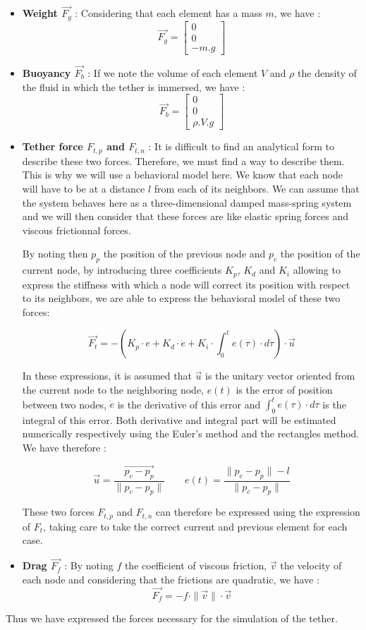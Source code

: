 \begin{itemize}
    \item \textbf{Weight $\overrightarrow{F_g}$} : Considering that each element has a mass $m$, we have : $$\overrightarrow{F_g} = \begin{bmatrix}0\\ 0\\ -m.g\end{bmatrix}$$
    \item \textbf{Buoyancy $\overrightarrow{F_b}$} : If we note the volume of each element $V$ and $\rho$ the density of the fluid in which the tether is immersed, we have : $$\overrightarrow{F_b} = \begin{bmatrix}0\\ 0\\ \rho.V.g\end{bmatrix}$$
    \item \textbf{Tether force $F_{t, p}$ and $F_{t, n}$} : It is difficult to find an analytical form to describe these two forces. Therefore, we must find a way to describe them. This is why we will use a behavioral model here. We know that each node will have to be at a distance $l$ from each of its neighbors. We can assume that the system behaves here as a three-dimensional damped mass-spring system and we will then consider that these forces are like elastic spring forces and viscous frictionnal forces.

    By noting then $p_{p}$ the position of the previous node and $p_{c}$ the position of the current node, by introducing three coefficients $K_p$, $K_d$ and $K_i$ allowing to express the stiffness with which a node will correct its position with respect to its neighbors, we are able to express the behavioral model of these two forces:
    
    $$\overrightarrow{F_{t}} = - \left(K_p \cdot e + K_d \cdot \dot e + K_i \cdot \int_{0}^te(\tau) \cdot d\tau \right) \cdot \overrightarrow{u}$$
    
    In these expressions, it is assumed that $\overrightarrow{u}$ is the unitary vector oriented from the current node to the neighboring node, $e(t)$ is the error of position between two nodes, $\dot e$ is the derivative of this error and $\int_{0}^te(\tau) \cdot d\tau$ is the integral of this error. Both derivative and integral part will be estimated numerically respectively using the Euler's method and the rectangles method. We have therefore :
    
    $$\overrightarrow{u} = \frac{\overrightarrow{p_c - p_p}}{\|p_c - p_p\|} \qquad e(t) = \frac{\|p_c - p_p\| - l}{\|p_c - p_p\|}$$
    
    These two forces $F_{t, p}$ and $F_{t, n}$ can therefore be expressed using the expression of $F_t$, taking care to take the correct current and previous element for each case.

    \item \textbf{Drag $\overrightarrow{F_f}$} : By noting $f$ the coefficient of viscous friction, $\overrightarrow{v}$ the velocity of each node and considering that the frictions are quadratic, we have : $$\overrightarrow{F_f} = -f \cdot \|\overrightarrow{v}\| \cdot \overrightarrow{v}$$
\end{itemize}

Thus we have expressed the forces necessary for the simulation of the tether.